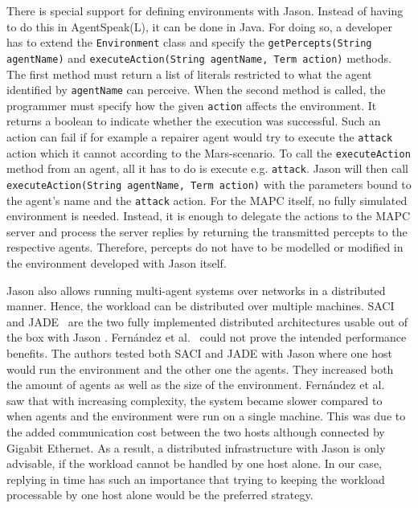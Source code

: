 There is special support for defining environments with Jason. Instead of having to do this in AgentSpeak(L), it can be done in Java. For doing so, a developer has to extend the \texttt{Environment} class and specify the \texttt{getPercepts(String agentName)} and \texttt{executeAction(String agentName, Term action)} methods. The first method must return a list of literals restricted to what the agent identified by \texttt{agentName} can perceive. When the second method is called, the programmer must specify how the given \texttt{action} affects the environment. It returns a boolean to indicate whether the execution was successful. Such an action can fail if for example a repairer agent would try to execute the \texttt{attack} action which it cannot according to the Mars-scenario. To call the \texttt{executeAction} method from an agent, all it has to do is execute e.g. \texttt{attack}. Jason will then call \texttt{executeAction(String agentName, Term action)} with the parameters bound to the agent's name and the \texttt{attack} action. For the MAPC itself, no fully simulated environment is needed. Instead, it is enough to delegate the actions to the MAPC server and process the server replies by returning the transmitted percepts to the respective agents. Therefore, percepts do not have to be modelled or modified in the environment developed with Jason itself.

Jason also allows running multi-agent systems over networks in a distributed manner. Hence, the workload can be distributed over multiple machines. SACI~\cite{hubner_saci_2000} and JADE~\cite{bellifemine_jade_2005} are the two fully implemented distributed architectures usable out of the box with Jason \cite{bordini_programming_2007}. Fernández et al.~\cite{fernandez_evaluating_2010} could not prove the intended performance benefits. The authors tested both SACI and JADE with Jason where one host would run the environment and the other one the agents. They increased both the amount of agents as well as the size of the environment. Fernández et al.~\cite{fernandez_evaluating_2010} saw that with increasing complexity, the system became slower compared to when agents and the environment were run on a single machine. This was due to the added communication cost between the two hosts although connected by Gigabit Ethernet. As a result, a distributed infrastructure with Jason is only advisable, if the workload cannot be handled by one host alone. In our case, replying in time has such an importance that trying to keeping the workload processable by one host alone would be the preferred strategy.

